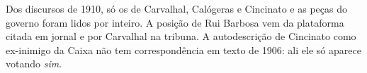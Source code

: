 
Dos discursos de 1910, só os de Carvalhal, Calógeras e Cincinato e as peças do
governo foram lidos por inteiro. A posição de Rui Barbosa vem da plataforma
citada em jornal e por Carvalhal na tribuna. A autodescrição de Cincinato como
ex-inimigo da Caixa não tem correspondência em texto de 1906: ali ele só
aparece votando \textit{sim}.
